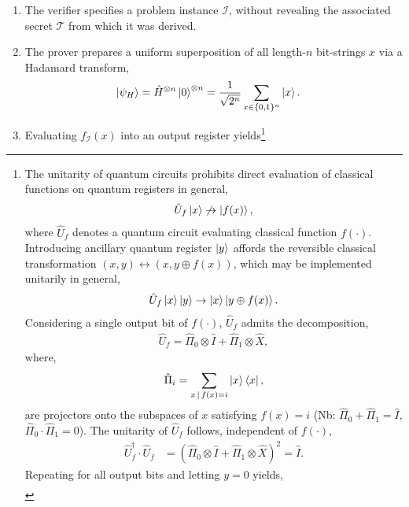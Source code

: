 \begin{enumerate}
	\item The verifier specifies a problem instance $\mathcal{I}$, without revealing the associated secret $\mathcal{T}$ from which it was derived.
	\item The prover prepares a uniform superposition of all length-$n$ bit-strings $x$ via a Hadamard transform,
	      \begin{align}
		      \ket{\psi_H} & = \hat{H}^{\otimes n} \ket{0}^{\otimes n} = \frac{1}{\sqrt{2^n}} \sum_{x\in\{0,1\}^n} \ket{x}.
	      \end{align}
	\item Evaluating $f_\mathcal{I}(x)$ into an output register yields\footnote{The unitarity of quantum circuits prohibits direct evaluation of classical functions on quantum registers in general,
		      \begin{align}
			      \hat{U}_f\ket{x}\not\to\ket{f(x)},\nonumber
		      \end{align}
		      where $\hat{U}_f$ denotes a quantum circuit evaluating classical function $f(\cdot)$. Introducing ancillary quantum register $\ket{y}$ affords the reversible classical transformation $(x,y)\leftrightarrow(x,y\oplus f(x))$, which may be implemented unitarily in general,
		      \begin{align}
			      \hat{U}_f\ket{x}\ket{y}\to\ket{x}\ket{y\oplus f(x)}.\nonumber
		      \end{align}
		      Considering a single output bit of $f(\cdot)$, $\hat{U}_f$ admits the decomposition,
		      \begin{align}
			      \hat{U}_f = \hat\Pi_0\otimes \hat{I} + \hat\Pi_1\otimes \hat{X},\nonumber
		      \end{align}
		      where,
		      \begin{align}
			      \hat\Pi_i = \sum_{x\,|\,f(x)=i}\ket{x}\bra{x},\nonumber
		      \end{align}
		      are projectors onto the subspaces of $x$ satisfying \mbox{$f(x)=i$} (Nb: \mbox{$\hat\Pi_0+\hat\Pi_1=\hat{I}$}, \mbox{$\hat\Pi_0\cdot\hat\Pi_1=0$}). The unitarity of $\hat{U}_f$ follows, independent of $f(\cdot)$,
		      \begin{align}
			      \hat{U}_f^\dag \cdot \hat{U}_f & = (\hat\Pi_{0}\otimes \hat{I} + \hat\Pi_1\otimes \hat{X})^2 = \hat{I}.\nonumber
		      \end{align}
		      Repeating for all output bits and letting \mbox{$y=0$} yields,
		      \begin{align}

\end{align}}
\end{enumerate}
